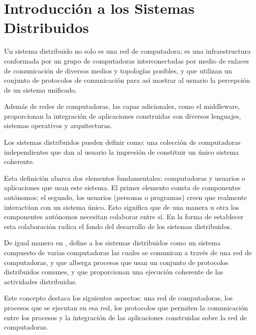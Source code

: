 
\setchapterpreamble[u]{\margintoc}

\chapter{Introducción a los Sistemas Distribuidos}
\label{cap:def-SD}

Un sistema distribuido no solo es una  red de computadora; es una infraestructura conformada por un grupo de computadoras interconectadas por medio de enlaces de comunicación de diversos medios y topologías posibles, y que utilizan un conjunto  de protocolos de comunicación para así mostrar al usuario la percepción de un sistema unificado.

Además de redes de computadoras, las capas adicionales, como el \gls{middleware}, proporcionan  la  integración de  aplicaciones construidas con diversos lenguajes, sistemas operativos y arquitecturas.
  
Los {sistemas distribuidos}  pueden definir  
como: una colección de computadoras independientes que dan al usuario la impresión de constituir un único sistema coherente. 

Esta definición  abarca dos elementos fundamentales:  computadoras y  usuarios o aplicaciones que usan este sistema. El primer elemento  consta de componentes   autónomos; el segundo,  los usuarios (personas o programas) creen que realmente interactúan con un sistema único.  Esto significa que de una manera u otra los componentes autónomos necesitan colaborar entre sí. En la forma de establecer esta colaboración radica  el fondo del desarrollo de los sistemas distribuidos.

De igual manera en  ,  define a los sistemas distribuidos como un sistema compuesto de varias computadoras las cuales se comunican a través de una red de computadoras, y que alberga procesos que usan un conjunto de protocolos distribuidos comunes, y que proporcionan una ejecución coherente de las actividades distribuidas.

Este concepto destaca los siguientes aspectos: una red de computadoras, los procesos que se ejecutan en esa red, los protocolos  que permiten la comunicación  entre los procesos y la integración de las aplicaciones construidas sobre la red de computadoras. 

